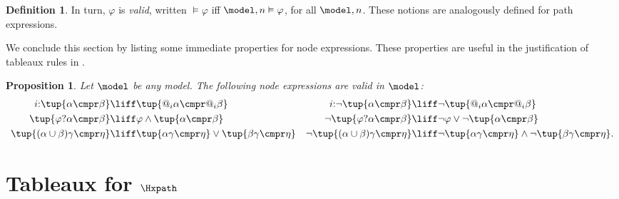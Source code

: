 \documentclass[10pt,a4paper]{amsart}
\newtheorem{prop}[thm]{Proposition}
\theoremstyle{definition}
\newtheorem{defi}[thm]{Definition}
\theoremstyle{remark}
\begin{document}
\begin{defi}
  In turn, $\varphi$ is \emph{valid}, written $\vDash \varphi$ iff $\model, n \vDash\varphi$, for all $\model, n$.
  These notions are analogously defined for path expressions. 
\end{defi}



We conclude this section by listing some immediate properties for node expressions.
These properties are useful in the justification of tableaux rules in .

\begin{prop}\label{prop:equivalences}
  Let $\model$ be any model. The following node expressions are valid in $\model$:
  \begin{align*}
    i{:}\tup{\alpha \cmpr \beta}
      & \liff \tup{@_i\alpha \cmpr @_i\beta} &
    i{:}\lnot\tup{\alpha \cmpr \beta}
      & \liff \lnot\tup{@_i\alpha \cmpr @_i\beta} \\
    \tup{\varphi?\alpha \cmpr \beta}
      & \liff \varphi \land \tup{\alpha \cmpr \beta} &
    \lnot\tup{\varphi?\alpha \cmpr \beta}
      & \liff \lnot\varphi \lor \lnot\tup{\alpha \cmpr \beta} \\
    \tup{(\alpha \cup \beta)\gamma \cmpr \eta}
      & \liff \tup{\alpha\gamma \cmpr \eta} \lor \tup{\beta\gamma \cmpr \eta} &
    \lnot\tup{(\alpha \cup \beta)\gamma \cmpr \eta} & \liff \lnot\tup{\alpha\gamma \cmpr \eta} \land \lnot\tup{\beta\gamma \cmpr \eta}.
  \end{align*}
\end{prop}

\section{Tableaux for $\Hxpath$} \label{sec:tableaux}
\end{document}
